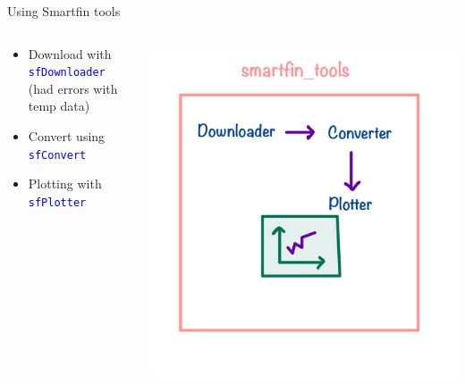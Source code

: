 \begin{frame}{Using Smartfin tools}
    \begin{columns}
        \begin{column}{0.55\textwidth}
            \raggedright
            \begin{itemize}
                \item Download with \texttt{\textcolor{blue}{sfDownloader}} (had errors with temp data)
                \item Convert using \texttt{\textcolor{blue}{sfConvert}}
                \item Plotting with \texttt{\textcolor{blue}{sfPlotter}}
            \end{itemize}
        \end{column}
        \begin{column}{0.45\textwidth}
            \vspace{-1em}
            \hspace{-1em}
            \centering
            \includegraphics[width=0.7\linewidth,keepaspectratio]{images/smartfin-tools.jpg}
        \end{column}
    \end{columns}
\end{frame}


